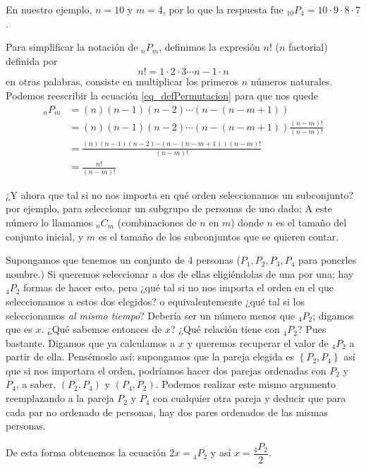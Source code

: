 \documentclass[spanish]{report}
\newcommand{\comb}[2]{ {}_{#1}C_{#2}}
\newcommand{\perm}[2]{ {}_{#1}P_{#2}}
\begin{document}
En nuestro ejemplo, $n=10$ y $m=4$, por lo que la respuesta fue $\perm{10}{4} = 10 \cdotp 9 \cdotp 8 \cdotp 7$.

Para simplificar la notación de $\perm{n}{m}$, definimos la expresión $n!$ ($n$ factorial) definida por \[ n! = 1 \cdotp 2 \cdotp 3 \cdots n-1 \cdotp n\]
en otras palabras, consiste en multiplicar los primeros $n$ números naturales.
Podemos reescribir la ecuación \ref{eq_defPermutacion} para que nos quede
\begin{align*}
\perm{n}{m} &= (n) (n-1) (n-2) \cdots (n-(n-m+1)) \\
	&= (n) (n-1) (n-2) \cdots (n-(n-m+1)) \frac{(n-m)!}{(n-m)!}\\
	&= \frac{(n) (n-1) (n-2) \cdots (n-(n-m+1)) (n-m)!}{(n-m)!}\\
	&= \frac{n!}{(n-m)!}
\end{align*}

¿Y ahora que tal si no nos importa en qué orden seleccionamos un subconjunto? por ejemplo, para seleccionar un subgrupo de personas de uno dado; %
A este número lo llamamos $\comb{n}{m}$ (combinaciones de $n$ en $m$) donde $n$ es el tamaño del conjunto inicial, y $m$ es el tamaño de los subconjuntos que se quieren contar.

Supongamos que tenemos un conjunto de 4 personas ($P_1, P_2, P_3, P_4$ para ponerles nombre.) Si queremos seleccionar a dos de ellas eligiéndolas de una por una; hay $\perm{4}{2}$ formas de hacer esto, pero ¿qué tal si no nos importa el orden en el que seleccionamos a estos dos elegidos? o equivalentemente ¿qué tal si los seleccionamos \emph{al mismo tiempo}?
Debería ser un número menor que $\perm{4}{2}$; digamos que es $x$.
¿Qué sabemos entonces de $x$? ¿Qué relación tiene con $\perm{4}{2}$? 
Pues bastante. Digamos que ya calculamos a $x$ y queremos recuperar el valor de $\perm{4}{2}$ a partir de ella.
Pensémoslo así: supongamos que la pareja elegida es $\left\lbrace P_2, P_4 \right\rbrace$ así que si nos importara el orden, podríamos hacer dos parejas ordenadas con $P_2$ y $P_4$, a saber, $(P_2, P_4)$ y $(P_4, P_2)$.
Podemos realizar este mismo argumento reemplazando a la pareja $P_2$ y $P_4$ con cualquier otra pareja y deducir que para cada par no ordenado de personas, hay dos pares ordenados de las mismas personas.

De esta forma obtenemos la ecuación $2 x = \perm{4}{2}$ y así $x = \dfrac{\perm{4}{2}}{2}$.
\end{document}
